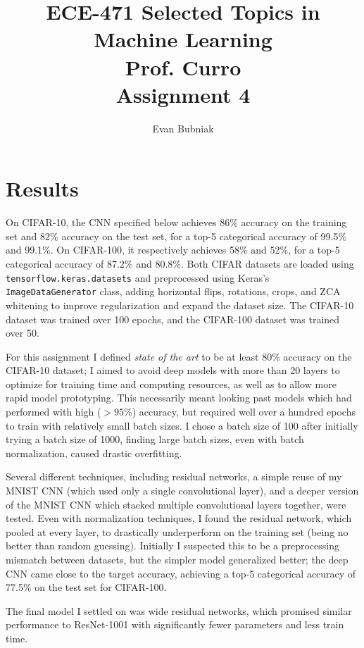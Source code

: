 \documentclass[12pt]{article}
\title{%
   ECE-471 Selected Topics in Machine Learning \\
   Prof. Curro \\
   Assignment 4}
\author{Evan Bubniak}
\begin{document}
\maketitle

\section{Results}

On CIFAR-10, the CNN specified below achieves 86\% accuracy on the training set and 82\% accuracy on the test set, for a top-5 categorical accuracy of 99.5\% and 99.1\%. On CIFAR-100, it respectively achieves 58\% and 52\%, for a top-5 categorical accuracy of 87.2\% and 80.8\%. Both CIFAR datasets are loaded using \verb|tensorflow.keras.datasets| and preprocessed using Keras's \verb|ImageDataGenerator| class, adding horizontal flips, rotations, crops, and ZCA whitening to improve regularization and expand the dataset size. The CIFAR-10 dataset was trained over 100 epochs, and the CIFAR-100 dataset was trained over 50.

For this assignment I defined \textit{state of the art} to be at least 80\% accuracy on the CIFAR-10 dataset; I aimed to avoid deep models with more than 20 layers to optimize for training time and computing resources, as well as to allow more rapid model prototyping. This necessarily meant looking past models which had performed with high ($>95\%$) accuracy, but required well over a hundred epochs to train with relatively small batch sizes. I chose a batch size of 100 after initially trying a batch size of 1000, finding large batch sizes, even with batch normalization, caused drastic overfitting.

Several different techniques, including residual networks, a simple reuse of my MNIST CNN (which used only a single convolutional layer), and a deeper version of the MNIST CNN which stacked multiple convolutional layers together, were tested. Even with normalization techniques, I found the residual network, which pooled at every layer, to drastically underperform on the training set (being no better than random guessing). Initially I suspected this to be a preprocessing mismatch between datasets, but the simpler model generalized better; the deep CNN came close to the target accuracy, achieving a top-5 categorical accuracy of 77.5\% on the test set for CIFAR-100.

The final model I settled on was wide residual networks, which promised similar performance to ResNet-1001 with significantly fewer parameters and less train time.
\end{document}
